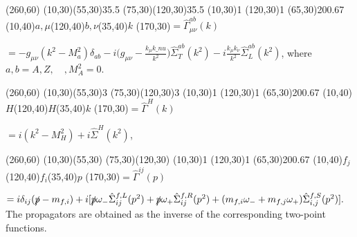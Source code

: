 \begin{axopicture}(260,60) %
	\Photon(10,30)(55,30){3}{5.5}
	\Photon(75,30)(120,30){3}{5.5}
	\Vertex(10,30){1}
	\Vertex(120,30){1}
	\GCirc(65,30){20}{0.67}
	\Text(10,40){$a,\mu$}\Text(120,40){$b,\nu$}\Text(35,40){$k$}
	\Text(170,30){$=\hat{\Gamma}^{ab}_{\mu\nu}(k)$}	
\end{axopicture}	
\newline$=-g_{\mu\nu}(k^2-M_a^2)\delta_{ab}-i\bigl(g_{\mu\nu}-\frac{k_\mu k\_nu}{k^2}\bigr)\hat{\Sigma}^{ab}_T(k^2)-i\frac{k_\mu k_\nu}{k^2}\hat{\Sigma}^{ab}_L(k^2)$, 
\newline\newline where $a,b=A,Z,\quad, M_A^2=0$.
\newline
\newline
\begin{axopicture}(260,60) %
	\DashLine(10,30)(55,30){3}
	\DashLine(75,30)(120,30){3}
	\Vertex(10,30){1}
	\Vertex(120,30){1}
	\GCirc(65,30){20}{0.67}
	\Text(10,40){$H$}\Text(120,40){$H$}\Text(35,40){$k$}
	\Text(170,30){$=\hat{\Gamma}^{H}(k)$}	
\end{axopicture}
\newline $=i(k^2-M_H^2)+i\hat{\Sigma}^H(k^2)$,
\newline
\newline
\begin{axopicture}(260,60) %
	\Line[arrow](10,30)(55,30)
	\Line[arrow](75,30)(120,30)
	\Vertex(10,30){1}
	\Vertex(120,30){1}
	\GCirc(65,30){20}{0.67}
	\Text(10,40){$f_j$}\Text(120,40){$f_i$}\Text(35,40){$p$}
	\Text(170,30){$=\hat{\Gamma}^{ij}(p)$}	
\end{axopicture}
\newline$=i\delta_{ij}(\slashed{p}-m_{f,i})+i[\slashed{p}\omega_-\hat{\Sigma}^{f,L}_{ij}(p^2)+\slashed{p}\omega_+\hat{\Sigma}^{f,R}_{ij}(p^2)+(m_{f,i}\omega_-+m_{f,j}\omega_+)\hat{\Sigma}^{f,S}_{i,j}(p^2) ]. $
The propagators are obtained as the inverse of the corresponding two-point functions.


